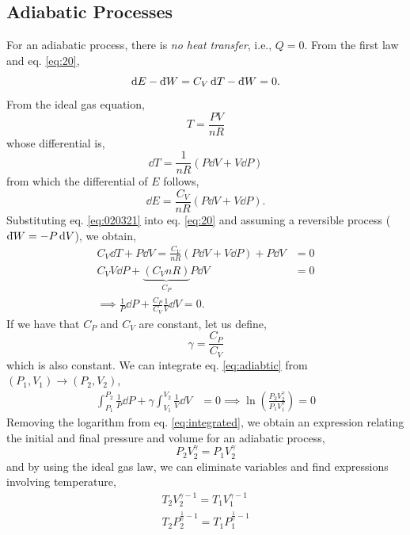 \documentclass{book}
\newcommand{\dbar}{\mathrm{d}\hspace*{-0.08em}\bar{}\hspace*{0.1em}}
\begin{document}
\subsection{Adiabatic Processes}
For an adiabatic process, there is \textit{no heat transfer}, i.e., $Q = 0$. From the first law and eq. \eqref{eq:20},
\begin{equation}
	\dd{E} - \dbar{W} = C_V\dd{T} - \dbar{W} = 0. \label{eq:203}
\end{equation}
From the ideal gas equation,
\begin{equation}
	T = \frac{PV}{nR}
\end{equation}
whose differential is,
\begin{equation}
	\dd{T} = \frac{1}{nR}\left(P\dd{V} + V \dd{P}\right)
\end{equation}
from which the differential of $E$ follows,
\begin{equation}
	\dd{E} = \frac{C_V}{nR}\left(P\dd{V} + V \dd{P}\right).\label{eq:020321}
\end{equation}
Substituting eq. \eqref{eq:020321} into eq. \eqref{eq:20} and assuming a reversible process ($\dbar W = - P \dd{V}$), we obtain,
\begin{equation}
	\begin{split}
		C_V \dd{T} + P\dd{V} = \frac{C_V}{nR}(P\dd{V}+V\dd{P}) + P \dd{V} & = 0 \\
		C_VV\dd{P} + \underbrace{(C_V nR)}_{C_P}P\dd{V} & = 0 \\
		\implies \frac{1}{P}\dd{P} + \frac{C_P}{C_V}\frac{1}{V}\dd{V} = 0. \label{eq:adiabtic}
	\end{split}
\end{equation}
If we have that $C_P$ and $C_V$ are constant, let us define,
\begin{equation}
	\gamma = \frac{C_P}{C_V}
\end{equation}
which is also constant. We can integrate eq. \eqref{eq:adiabtic} from $(P_1,V_1) \to (P_2, V_2)$,
\begin{equation}
	\begin{split}
	\int_{P_1}^{P_2}\frac{1}{P}\dd{P} + \gamma \int_{V_1}^{V_2}\frac{1}{V}\dd{V} & = 0
	\implies \ln\left(\frac{P_2V_2^{\gamma}}{P_1V_1^{\gamma}}\right) = 0 \label{eq:integrated}
	\end{split}
\end{equation}
Removing the logarithm from eq. \eqref{eq:integrated}, we obtain an expression relating the initial and final pressure and volume for an adiabatic process,
\begin{equation}
	\boxed{P_2V_2^{\gamma} = P_1V_2^{\gamma}}
\end{equation}
and by using the ideal gas law, we can eliminate variables and find expressions involving temperature,
\begin{align}
	\boxed{T_2V_2^{\gamma -1} = T_1V_1^{\gamma -1}} \\
	\boxed{T_2P_2^{\frac{1}{\gamma} - 1} = T_1P_1^{\frac{1}{\gamma} - 1}}
\end{align}
\end{document}
